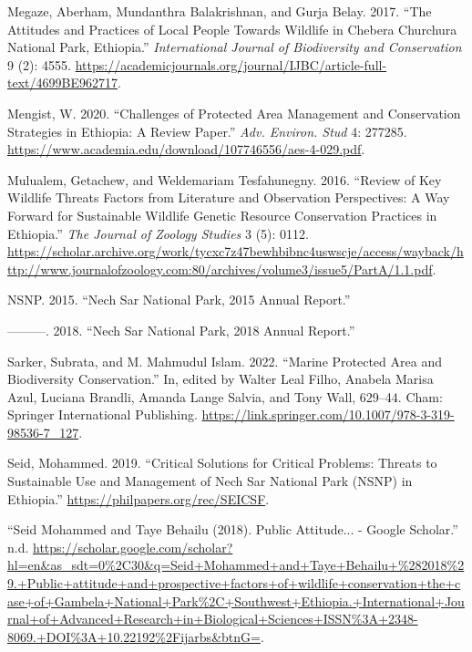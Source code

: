 \documentclass[
  letterpaper,
  DIV=11,
  numbers=noendperiod]{scrartcl}
\newlength{\cslhangindent}
\newenvironment{CSLReferences}[2] %
 {\begin{list}{}{%
  \setlength{\itemindent}{0pt}
  \setlength{\leftmargin}{0pt}
  \setlength{\parsep}{0pt}
  \ifodd #1
   \setlength{\leftmargin}{\cslhangindent}
   \setlength{\itemindent}{-1\cslhangindent}
  \fi
  \setlength{\itemsep}{#2\baselineskip}}}
 {\end{list}}
\begin{document}
\begin{CSLReferences}{1}{0}
Megaze, Aberham, Mundanthra Balakrishnan, and Gurja Belay. 2017. {``The
Attitudes and Practices of Local People Towards Wildlife in Chebera
Churchura National Park, Ethiopia.''} \emph{International Journal of
Biodiversity and Conservation} 9 (2): 4555.
\url{https://academicjournals.org/journal/IJBC/article-full-text/4699BE962717}.

Mengist, W. 2020. {``Challenges of Protected Area Management and
Conservation Strategies in Ethiopia: A Review Paper.''} \emph{Adv.
Environ. Stud} 4: 277285.
\url{https://www.academia.edu/download/107746556/aes-4-029.pdf}.

Mulualem, Getachew, and Weldemariam Tesfahunegny. 2016. {``Review of Key
Wildlife Threats Factors from Literature and Observation Perspectives: A
Way Forward for Sustainable Wildlife Genetic Resource Conservation
Practices in Ethiopia.''} \emph{The Journal of Zoology Studies} 3 (5):
0112.
\url{https://scholar.archive.org/work/tycxc7z47bewhbibnc4uswscje/access/wayback/http://www.journalofzoology.com:80/archives/volume3/issue5/PartA/1.1.pdf}.

NSNP. 2015. {``Nech Sar National Park, 2015 Annual Report.''}

---------. 2018. {``Nech Sar National Park, 2018 Annual Report.''}

Sarker, Subrata, and M. Mahmudul Islam. 2022. {``Marine Protected Area
and Biodiversity Conservation.''} In, edited by Walter Leal Filho,
Anabela Marisa Azul, Luciana Brandli, Amanda Lange Salvia, and Tony
Wall, 629--44. Cham: Springer International Publishing.
\url{https://link.springer.com/10.1007/978-3-319-98536-7_127}.

Seid, Mohammed. 2019. {``Critical Solutions for Critical Problems:
Threats to Sustainable Use and Management of Nech Sar National Park
(NSNP) in Ethiopia.''} \url{https://philpapers.org/rec/SEICSF}.

{``Seid Mohammed and Taye Behailu (2018). Public Attitude... - Google
Scholar.''} n.d.
\url{https://scholar.google.com/scholar?hl=en&as_sdt=0\%2C30&q=Seid+Mohammed+and+Taye+Behailu+\%282018\%29.+Public+attitude+and+prospective+factors+of+wildlife+conservation+the+case+of+Gambela+National+Park\%2C+Southwest+Ethiopia.+International+Journal+of+Advanced+Research+in+Biological+Sciences+ISSN\%3A+2348-8069.+DOI\%3A+10.22192\%2Fijarbs&btnG=}.


\end{CSLReferences}
\end{document}
